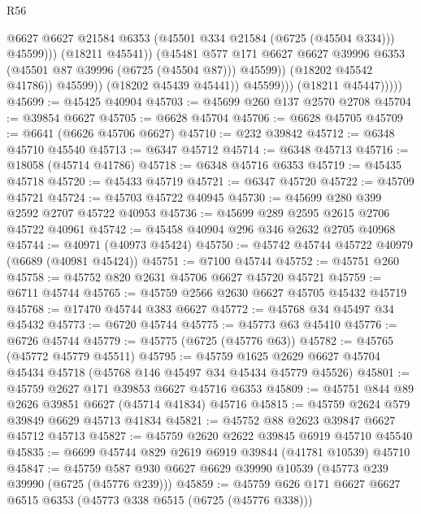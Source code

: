 \begin{lexlean}{R56}
\begin{coremodule}
                                    @6627
                                    @6627
                                    @21584
                                    @6353
                                    (@45501 @334 @21584 (@6725 (@45504 @334)))
                                    @45599)))
                              (@18211 @45541))
                            (@45481
                              @577
                              @171
                              @6627
                              @6627
                              @39996
                              @6353
                              (@45501 @87 @39996 (@6725 (@45504 @87)))
                              @45599))
                          (@18202 @45542 @41786))
                        @45599))
                    (@18202 @45439 @45441))
                  @45599)))
            (@18211 @45447)))))
@45699 := @45425 @40904
@45703 := @45699 @260 @137 @2570 @2708
@45704 := @39854 @6627
@45705 := @6628 @45704
@45706 := @6628 @45705
@45709 := @6641 (@6626 @45706 @6627)
@45710 := @232 @39842
@45712 := @6348 @45710 @45540
@45713 := @6347 @45712
@45714 := @6348 @45713
@45716 := @18058 (@45714 @41786)
@45718 := @6348 @45716 @6353
@45719 := @45435 @45718
@45720 := @45433 @45719
@45721 := @6347 @45720
@45722 := @45709 @45721
@45724 := @45703 @45722 @40945
@45730 := @45699 @280 @399 @2592 @2707 @45722 @40953
@45736 := @45699 @289 @2595 @2615 @2706 @45722 @40961
@45742 := @45458 @40904 @296 @346 @2632 @2705 @40968
@45744 := @40971 (@40973 @45424)
@45750 := @45742 @45744 @45722 @40979 (@6689 (@40981 @45424))
@45751 := @7100 @45744
@45752 := @45751 @260
@45758 := @45752 @820 @2631 @45706 @6627 @45720 @45721
@45759 := @6711 @45744
@45765 := @45759 @2566 @2630 @6627 @45705 @45432 @45719
@45768 := @17470 @45744 @383 @6627
@45772 := @45768 @34 @45497 @34 @45432
@45773 := @6720 @45744
@45775 := @45773 @63 @45410
@45776 := @6726 @45744
@45779 := @45775 (@6725 (@45776 @63))
@45782 := @45765 (@45772 @45779 @45511)
@45795 := @45759
    @1625
    @2629
    @6627
    @45704
    @45434
    @45718
    (@45768 @146 @45497 @34 @45434 @45779 @45526)
@45801 := @45759 @2627 @171 @39853 @6627 @45716 @6353
@45809 := @45751 @844 @89 @2626 @39851 @6627 (@45714 @41834) @45716
@45815 := @45759 @2624 @579 @39849 @6629 @45713 @41834
@45821 := @45752 @88 @2623 @39847 @6627 @45712 @45713
@45827 := @45759 @2620 @2622 @39845 @6919 @45710 @45540
@45835 := @6699 @45744 @829 @2619 @6919 @39844 (@41781 @10539) @45710
@45847 := @45759 @587 @930 @6627 @6629 @39990 @10539 (@45773 @239 @39990 (@6725 (@45776 @239)))
@45859 := @45759 @626 @171 @6627 @6627 @6515 @6353 (@45773 @338 @6515 (@6725 (@45776 @338)))

\end{coremodule}
\end{lexlean}
